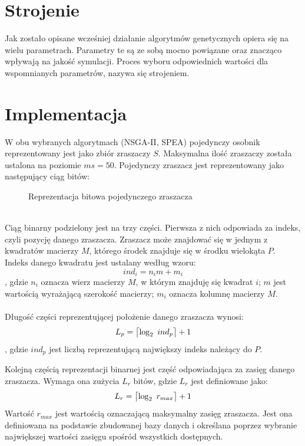 \documentclass[twoside]{iisthesis}
\begin{document}
\section{Strojenie}
Jak zostało opisane wcześniej działanie algorytmów genetycznych opiera się na wielu parametrach. Parametry te są ze sobą mocno  powiązane oraz znacząco wpływają na jakość symulacji. Proces wyboru odpowiednich wartości dla wspomnianych parametrów, nazywa się strojeniem.
\section{Implementacja}
W obu wybranych algorytmach (NSGA-II, SPEA) pojedynczy osobnik reprezentowany jest jako zbiór zraszaczy $S$. Maksymalna ilość zraszaczy została ustalona na poziomie $ms = 50$. Pojedynczy zraszacz jest reprezentowany jako następujący ciąg bitów:
\begin{figure}[!htb]
	\centering
	\caption{Reprezentacja bitowa pojedynczego zraszacza}
	\label{fig:sprinkler_bin_repr}
\end{figure}
\\Ciąg binarny podzielony jest na trzy części. Pierwsza z nich odpowiada za indeks, czyli pozycję danego zraszacza. Zraszacz może znajdować się w jednym z kwadratów macierzy $M$, którego środek znajduje się w środku wielokąta $P$. Indeks danego kwadratu jest ustalany według wzoru:
\begin{equation}
	ind_{i} = n_{i} m + m_{i}
\end{equation}
, gdzie $n_{i}$ oznacza wierz macierzy $M$, w którym znajduję się kwadrat $i$; $m$ jest wartością wyrażającą szerokość macierzy; $m_{i}$ oznacza kolumnę macierzy $M$.\\\\
Długość części reprezentującej położenie danego zraszacza wynosi:
\DeclarePairedDelimiter{\ceil}{\lceil}{\rceil}
\begin{equation}
	L_{p} = \ceil[\big]{\log_{2} \text{ } ind_{p}} + 1
\end{equation}
, gdzie $ind_p$ jest liczbą reprezentującą największy indeks należący do $P$.

Kolejną częścią reprezentacji binarnej jest część odpowiadająca za zasięg danego zraszacza. Wymaga ona zużycia $L_{r}$ bitów, gdzie $L_{r}$ jest definiowane jako:
\begin{equation}
	L_{r} = \ceil[\big]{\log_{2} \text{ } r_{max}} + 1
\end{equation}
Wartość $r_{max}$ jest wartością oznaczającą maksymalny zasięg zraszacza. Jest ona definiowana na podstawie zbudowanej bazy danych i określana poprzez wybranie największej wartości zasięgu spośród wszystkich dostępnych.
\end{document}
